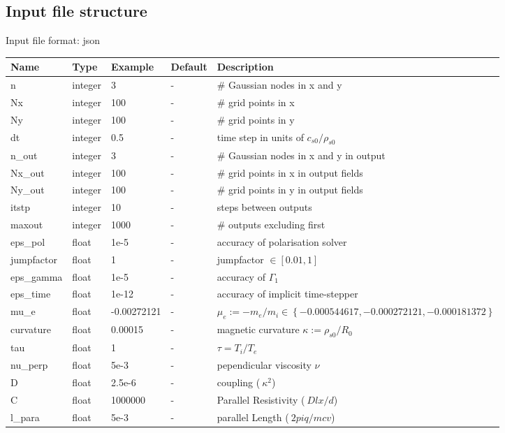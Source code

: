 \subsection{Input file structure}
Input file format: json

\begin{longtable}{llll>{\RaggedRight}p{7cm}}
\toprule
\rowcolor{gray!50}\textbf{Name} &  \textbf{Type} & \textbf{Example} & \textbf{Default} & \textbf{Description}  \\ \midrule
n      & integer & 3 & - &\# Gaussian nodes in x and y \\
Nx     & integer &100& - &\# grid points in x \\
Ny     & integer &100& - &\# grid points in y \\
dt     & integer &0.5& - &time step in units of $c_{s0}/\rho_{s0}$ \\
n\_out  & integer &3  & - &\# Gaussian nodes in x and y in output \\
Nx\_out & integer &100& - &\# grid points in x in output fields \\
Ny\_out & integer &100& - &\# grid points in y in output fields \\
itstp  & integer &10  & - &   steps between outputs \\
maxout & integer &1000& - &      \# outputs excluding first \\
eps\_pol   & float &1e-5    & - &  accuracy of polarisation solver \\
jumpfactor & float &1& - &     jumpfactor $\in \left[0.01,1\right]$\\
eps\_gamma & float &1e-5    & - & accuracy of $\Gamma_1$ \\
eps\_time  & float &1e-12   & - & accuracy of implicit time-stepper \\
mu\_e       & float & -0.00272121& - & $\mu_e :=-m_e/m_i \in \left\{ -0.000544617, -0.000272121, -0.000181372 \right\}$\\
curvature  & float &0.00015& - & magnetic curvature $\kappa:=\rho_{s0}/R_0$ \\
tau        & float &1      & - & $\tau = T_i/T_e$  \\
nu\_perp   & float &5e-3   & - & pependicular viscosity $\nu$ \\
D          & float &2.5e-6    & - & coupling ($ ~ \kappa^2$)\\
C          & float & 1000000  & - & Parallel Resistivity ($~D lx/d$)     \\
l\_para    & float &5e-3   & - & parallel Length ($~ 2 pi q / mcv$) \\

\end{longtable}
